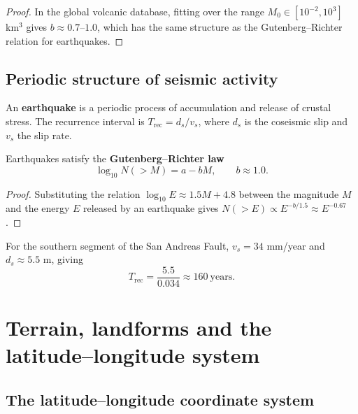 \begin{proof}
In the global volcanic database, fitting over the range $M_0\in[10^{-2},10^3]$ km$^3$ gives $b\approx 0.7$--$1.0$, which has the same structure as the Gutenberg--Richter relation for earthquakes.
\end{proof}

\subsection{Periodic structure of seismic activity}

\begin{definition}\label{def:seismic_cycle}
An \textbf{earthquake} is a periodic process of accumulation and release of crustal stress. The recurrence interval is $T_{\text{rec}}=d_s/v_s$, where $d_s$ is the coseismic slip and $v_s$ the slip rate.
\end{definition}

\begin{proposition}\label{prop:seismic_frequency}
Earthquakes satisfy the \textbf{Gutenberg--Richter law}
\[
\log_{10}N(>M)=a-bM,\qquad b\approx 1.0.
\]
\end{proposition}

\begin{proof}
Substituting the relation $\log_{10}E\approx 1.5M+4.8$ between the magnitude $M$ and the energy $E$ released by an earthquake gives $N(>E)\propto E^{-b/1.5}\approx E^{-0.67}$.
\end{proof}

\begin{example}\label{ex:geo_seismic_rec}
For the southern segment of the San Andreas Fault, $v_s=34$ mm/year and $d_s\approx 5.5$ m, giving
\[
T_{\text{rec}}=\frac{5.5}{0.034}\approx 160\ \text{years}.
\]
\end{example}

\section{Terrain, landforms and the latitude--longitude system}
\label{sec:terrain_coordinates}

\subsection{The latitude--longitude coordinate system}

